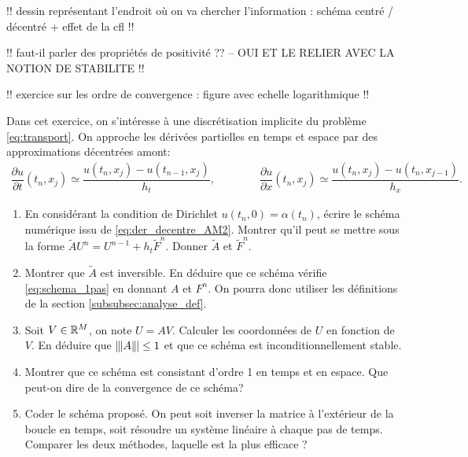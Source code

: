 \documentclass[12pt,a4paper,twoside]{article}
\begin{document}
!! dessin repr\'esentant l'endroit o\`u on va chercher l'information :
sch\'ema centr\'e / d\'ecentr\'e + effet de la cfl !!

!! faut-il parler des propri\'et\'es de positivit\'e ??
-- OUI ET LE RELIER AVEC LA NOTION DE STABILITE !!

!! exercice sur les ordre de convergence : figure avec echelle logarithmique !!

\begin{exercise}
  \label{exo:transport_implicite}
  Dans cet exercice, on s'int\'eresse \`a une discr\'etisation implicite du probl\`eme
  \eqref{eq:transport}.
  On approche les d\'eriv\'ees partielles en temps et espace
  par des approximations d\'ecentr\'ees amont:
  \begin{align}
    \label{eq:der_decentre_AM2}
    \dfrac{\partial u}{\partial t}(t_n,x_j) \simeq \dfrac{u(t_{n},x_j) - u(t_{n-1},x_j)}{h_t} ,
    \qquad \qquad 
    \dfrac{\partial u}{\partial x}(t_n,x_j) \simeq \dfrac{u(t_n,x_{j}) - u(t_n,x_{j-1})}{h_x} .
  \end{align}
  
  \begin{enumerate}
  \item En consid\'erant la condition de Dirichlet $u(t_n,0) = \alpha(t_n)$, 
    \'ecrire le sch\'ema num\'erique issu de \eqref{eq:der_decentre_AM2}.
    Montrer qu'il peut se mettre sous la forme $\widetilde{A} U^{n} = U^{n-1} + h_t \widetilde{F}^n$.
    Donner $\widetilde{A}$ et $\widetilde{F}^n$.
  \item Montrer que $\widetilde{A}$ est inversible. En d\'eduire que ce sch\'ema v\'erifie
    \eqref{eq:schema_1pas} en donnant $A$ et $F^n$.
    On pourra donc utiliser les d\'efinitions de la section \ref{subsubsec:analyse_def}.
  \item Soit $V \in \mathbb{R}^M$, on note $U = A V$. 
    Calculer les coordonn\'ees de $U$ en fonction de $V$.
    En d\'eduire que $\|\!\;\!| A \|\!\;\!| \leq 1$ et que
    ce sch\'ema est inconditionnellement stable.
    
  \item Montrer que ce sch\'ema est consistant d'ordre 1 en temps et en espace.
    Que peut-on dire de la convergence de ce sch\'ema?

  \item Coder le sch\'ema propos\'e. On peut soit inverser la matrice \`a l'ext\'erieur
    de la boucle en temps, soit r\'esoudre un syst\`eme lin\'eaire \`a chaque pas de temps.
    Comparer les deux m\'ethodes, laquelle est la plus efficace ?
    

\end{enumerate}
\end{exercise}
\end{document}
